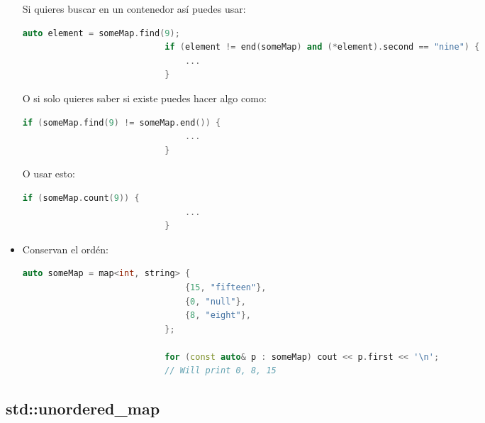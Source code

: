 \documentclass[12pt, fleqn]{report}                             %
\theoremstyle{break}                                            %
\begin{document}
\begin{itemize}
                        Si quieres buscar en un contenedor así puedes usar:
                        \begin{lstlisting}[language=C++, gobble=28]
                            auto element = someMap.find(9);
                            if (element != end(someMap) and (*element).second == "nine") {
                                ...
                            }
                        \end{lstlisting}

                        O si solo quieres saber si existe puedes hacer algo como:
                        \begin{lstlisting}[language=C++, gobble=28]
                            if (someMap.find(9) != someMap.end()) {   
                                ...
                            }
                        \end{lstlisting}

                        O usar esto:
                        \begin{lstlisting}[language=C++, gobble=28]
                            if (someMap.count(9)) {   
                                ...
                            }
                        \end{lstlisting}

                    \item 
                        Conservan el ordén:
                        \begin{lstlisting}[language=C++, gobble=28]
                            auto someMap = map<int, string> {
                                {15, "fifteen"},
                                {0, "null"},
                                {8, "eight"},
                            };

                            for (const auto& p : someMap) cout << p.first << '\n';
                            // Will print 0, 8, 15
                        \end{lstlisting}
                \end{itemize}


                \subsection{std::unordered\_map}
        
\end{document}
